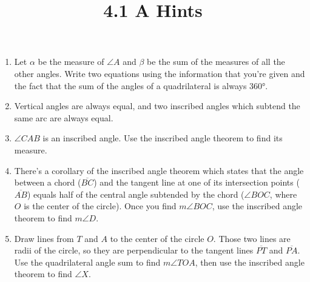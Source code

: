 \documentclass{article}
\title{4.1 A Hints}
\author{}
\date{}
\begin{document}
\maketitle

\begin{enumerate}
	\item Let $\alpha$ be the measure of $\angle A$ and $\beta$ be the sum of the measures of all the other angles.
		Write two equations using the information that you're given and the fact that the sum of the angles of a quadrilateral is always $\ang{360}$.
	\item Vertical angles are always equal, and two inscribed angles which subtend the same arc are always equal.
	\item $\angle CAB$ is an inscribed angle.
		Use the inscribed angle theorem to find its measure.
	\item There's a corollary of the inscribed angle theorem which states that the angle between a chord ($\overline{BC}$) and the tangent line at one of its intersection points ($\overline{AB}$) equals half of the central angle subtended by the chord ($\angle BOC$, where $O$ is the center of the circle).
		Once you find $m\angle BOC$, use the inscribed angle theorem to find $m\angle D$.
	\item Draw lines from $T$ and $A$ to the center of the circle $O$.
		Those two lines are radii of the circle, so they are perpendicular to the tangent lines $\overline{PT}$ and $\overline{PA}$.
		Use the quadrilateral angle sum to find $m\angle TOA$, then use the inscribed angle theorem to find $\angle X$.
\end{enumerate}
\end{document}
